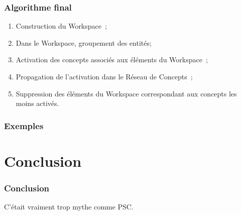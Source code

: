 \documentclass[12pt, handout]{beamer}
\begin{document}
\begin{frame}
 \frametitle{Algorithme final}

 \begin{enumerate}
  \item Construction du Workspace~;
  \item Dans le Workspace, groupement des entités;
  \item Activation des concepts associés aux éléments du Workspace~;
  \item Propagation de l'activation dans le Réseau de Concepts~;
  \item Suppression des éléments du Workspace correspondant aux concepts les moins activés.
 \end{enumerate}
 
\end{frame}

\begin{frame}
 \frametitle{Exemples}
 
 
\end{frame}

\section{Conclusion}

\begin{frame}
 \frametitle{Conclusion}
 
C'était vraiment trop mythe comme PSC\@.
 
\end{frame}
\end{document}
